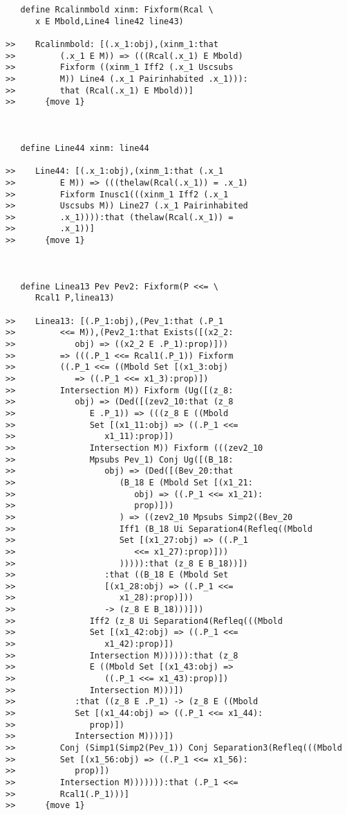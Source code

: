 \documentclass[12pt]{article}
\begin{document}
\begin{verbatim}
   define Rcalinmbold xinm: Fixform(Rcal \
      x E Mbold,Line4 line42 line43)

>>    Rcalinmbold: [(.x_1:obj),(xinm_1:that
>>         (.x_1 E M)) => (((Rcal(.x_1) E Mbold)
>>         Fixform ((xinm_1 Iff2 (.x_1 Uscsubs
>>         M)) Line4 (.x_1 Pairinhabited .x_1))):
>>         that (Rcal(.x_1) E Mbold))]
>>      {move 1}



   define Line44 xinm: line44

>>    Line44: [(.x_1:obj),(xinm_1:that (.x_1
>>         E M)) => (((thelaw(Rcal(.x_1)) = .x_1)
>>         Fixform Inusc1(((xinm_1 Iff2 (.x_1
>>         Uscsubs M)) Line27 (.x_1 Pairinhabited
>>         .x_1)))):that (thelaw(Rcal(.x_1)) =
>>         .x_1))]
>>      {move 1}



   define Linea13 Pev Pev2: Fixform(P <<= \
      Rcal1 P,linea13)

>>    Linea13: [(.P_1:obj),(Pev_1:that (.P_1
>>         <<= M)),(Pev2_1:that Exists([(x2_2:
>>            obj) => ((x2_2 E .P_1):prop)]))
>>         => (((.P_1 <<= Rcal1(.P_1)) Fixform
>>         ((.P_1 <<= ((Mbold Set [(x1_3:obj)
>>            => ((.P_1 <<= x1_3):prop)])
>>         Intersection M)) Fixform (Ug([(z_8:
>>            obj) => (Ded([(zev2_10:that (z_8
>>               E .P_1)) => (((z_8 E ((Mbold
>>               Set [(x1_11:obj) => ((.P_1 <<=
>>                  x1_11):prop)])
>>               Intersection M)) Fixform (((zev2_10
>>               Mpsubs Pev_1) Conj Ug([(B_18:
>>                  obj) => (Ded([(Bev_20:that
>>                     (B_18 E (Mbold Set [(x1_21:
>>                        obj) => ((.P_1 <<= x1_21):
>>                        prop)]))
>>                     ) => ((zev2_10 Mpsubs Simp2((Bev_20
>>                     Iff1 (B_18 Ui Separation4(Refleq((Mbold
>>                     Set [(x1_27:obj) => ((.P_1
>>                        <<= x1_27):prop)]))
>>                     ))))):that (z_8 E B_18))])
>>                  :that ((B_18 E (Mbold Set
>>                  [(x1_28:obj) => ((.P_1 <<=
>>                     x1_28):prop)]))
>>                  -> (z_8 E B_18)))]))
>>               Iff2 (z_8 Ui Separation4(Refleq(((Mbold
>>               Set [(x1_42:obj) => ((.P_1 <<=
>>                  x1_42):prop)])
>>               Intersection M)))))):that (z_8
>>               E ((Mbold Set [(x1_43:obj) =>
>>                  ((.P_1 <<= x1_43):prop)])
>>               Intersection M)))])
>>            :that ((z_8 E .P_1) -> (z_8 E ((Mbold
>>            Set [(x1_44:obj) => ((.P_1 <<= x1_44):
>>               prop)])
>>            Intersection M))))])
>>         Conj (Simp1(Simp2(Pev_1)) Conj Separation3(Refleq(((Mbold
>>         Set [(x1_56:obj) => ((.P_1 <<= x1_56):
>>            prop)])
>>         Intersection M))))))):that (.P_1 <<=
>>         Rcal1(.P_1)))]
>>      {move 1}




\end{verbatim}
\end{document}
